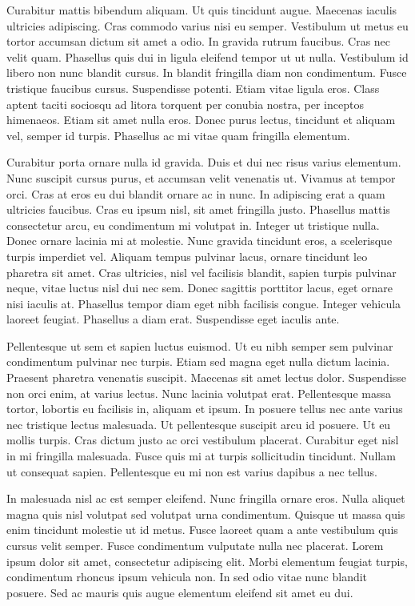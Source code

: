 Curabitur mattis bibendum aliquam. Ut quis tincidunt augue. Maecenas iaculis ultricies adipiscing. Cras commodo varius nisi eu semper. Vestibulum ut metus eu tortor accumsan dictum sit amet a odio. In gravida rutrum faucibus. Cras nec velit quam. Phasellus quis dui in ligula eleifend tempor ut ut nulla. Vestibulum id libero non nunc blandit cursus. In blandit fringilla diam non condimentum. Fusce tristique faucibus cursus. Suspendisse potenti. Etiam vitae ligula eros. Class aptent taciti sociosqu ad litora torquent per conubia nostra, per inceptos himenaeos. Etiam sit amet nulla eros. Donec purus lectus, tincidunt et aliquam vel, semper id turpis. Phasellus ac mi vitae quam fringilla elementum.

Curabitur porta ornare nulla id gravida. Duis et dui nec risus varius elementum. Nunc suscipit cursus purus, et accumsan velit venenatis ut. Vivamus at tempor orci. Cras at eros eu dui blandit ornare ac in nunc. In adipiscing erat a quam ultricies faucibus. Cras eu ipsum nisl, sit amet fringilla justo. Phasellus mattis consectetur arcu, eu condimentum mi volutpat in. Integer ut tristique nulla. Donec ornare lacinia mi at molestie. Nunc gravida tincidunt eros, a scelerisque turpis imperdiet vel. Aliquam tempus pulvinar lacus, ornare tincidunt leo pharetra sit amet. Cras ultricies, nisl vel facilisis blandit, sapien turpis pulvinar neque, vitae luctus nisl dui nec sem. Donec sagittis porttitor lacus, eget ornare nisi iaculis at. Phasellus tempor diam eget nibh facilisis congue. Integer vehicula laoreet feugiat. Phasellus a diam erat. Suspendisse eget iaculis ante.

Pellentesque ut sem et sapien luctus euismod. Ut eu nibh semper sem pulvinar condimentum pulvinar nec turpis. Etiam sed magna eget nulla dictum lacinia. Praesent pharetra venenatis suscipit. Maecenas sit amet lectus dolor. Suspendisse non orci enim, at varius lectus. Nunc lacinia volutpat erat. Pellentesque massa tortor, lobortis eu facilisis in, aliquam et ipsum. In posuere tellus nec ante varius nec tristique lectus malesuada. Ut pellentesque suscipit arcu id posuere. Ut eu mollis turpis. Cras dictum justo ac orci vestibulum placerat. Curabitur eget nisl in mi fringilla malesuada. Fusce quis mi at turpis sollicitudin tincidunt. Nullam ut consequat sapien. Pellentesque eu mi non est varius dapibus a nec tellus.

In malesuada nisl ac est semper eleifend. Nunc fringilla ornare eros. Nulla aliquet magna quis nisl volutpat sed volutpat urna condimentum. Quisque ut massa quis enim tincidunt molestie ut id metus. Fusce laoreet quam a ante vestibulum quis cursus velit semper. Fusce condimentum vulputate nulla nec placerat. Lorem ipsum dolor sit amet, consectetur adipiscing elit. Morbi elementum feugiat turpis, condimentum rhoncus ipsum vehicula non. In sed odio vitae nunc blandit posuere. Sed ac mauris quis augue elementum eleifend sit amet eu dui.


